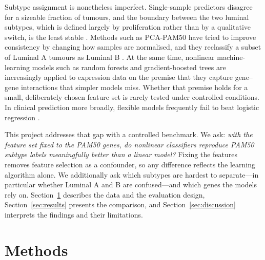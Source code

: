 \documentclass[10pt,twocolumn]{article}
\begin{document}
Subtype assignment is nonetheless imperfect. Single-sample predictors disagree for a sizeable fraction of tumours, and the boundary between the two luminal subtypes, which is defined largely by proliferation rather than by a qualitative switch, is the least stable \citep{weigelt2010}. Methods such as PCA-PAM50 have tried to improve consistency by changing how samples are normalised, and they reclassify a subset of Luminal A tumours as Luminal B \citep{paquet2019}. At the same time, nonlinear machine-learning models such as random forests and gradient-boosted trees are increasingly applied to expression data on the premise that they capture gene--gene interactions that simpler models miss. Whether that premise holds for a small, deliberately chosen feature set is rarely tested under controlled conditions. In clinical prediction more broadly, flexible models frequently fail to beat logistic regression \citep{christodoulou2019}.

This project addresses that gap with a controlled benchmark. We ask: \emph{with the feature set fixed to the PAM50 genes, do nonlinear classifiers reproduce PAM50 subtype labels meaningfully better than a linear model?} Fixing the features removes feature selection as a confounder, so any difference reflects the learning algorithm alone. We additionally ask which subtypes are hardest to separate---in particular whether Luminal A and B are confused---and which genes the models rely on. Section~\ref{sec:methods} describes the data and the evaluation design, Section~\ref{sec:results} presents the comparison, and Section~\ref{sec:discussion} interprets the findings and their limitations.

\section{Methods}\label{sec:methods}
\end{document}
